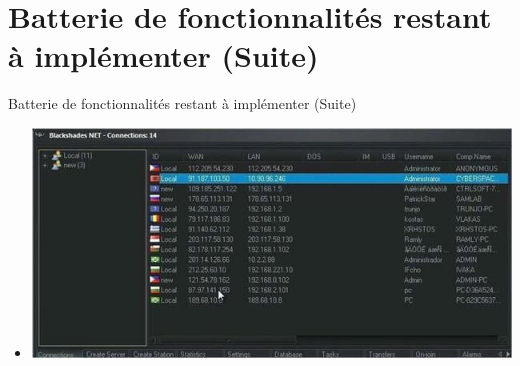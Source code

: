 \documentclass{beamer}
\begin{document}
\section{Batterie de fonctionnalités restant à implémenter (Suite)}
  \begin{frame}{Batterie de fonctionnalités restant à implémenter (Suite)}
  \begin{itemize}
	\item
	 \includegraphics[scale=.5]{blackshades.jpeg}
  \end{itemize}
  \end{frame}
\end{document}

